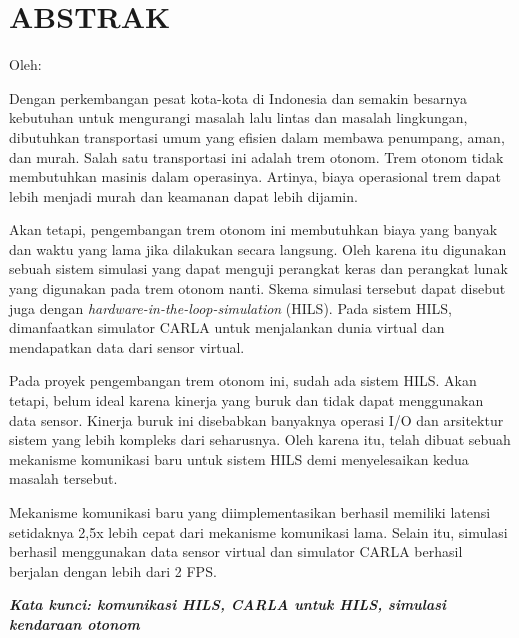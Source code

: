 \chapter*{ABSTRAK}

\begin{center}
	\bfseries \MakeUppercase{\thetitle}

	\normalfont\normalsize
	Oleh:

	\theauthor
\end{center}

\begin{singlespace}
	Dengan perkembangan pesat kota-kota di Indonesia dan semakin besarnya
	kebutuhan untuk mengurangi masalah lalu lintas dan masalah lingkungan,
	dibutuhkan transportasi umum yang efisien dalam membawa penumpang, aman, dan
	murah. Salah satu transportasi ini adalah trem otonom. Trem otonom tidak
	membutuhkan masinis dalam operasinya. Artinya, biaya operasional trem dapat
	lebih menjadi murah dan keamanan dapat lebih dijamin.

	Akan tetapi, pengembangan trem otonom ini membutuhkan biaya yang banyak dan
	waktu yang lama jika dilakukan secara langsung. Oleh karena itu digunakan
	sebuah sistem simulasi yang dapat menguji perangkat keras dan
	perangkat lunak yang digunakan pada trem otonom nanti. Skema simulasi
	tersebut dapat disebut juga dengan \textit{hardware-in-the-loop-simulation}
	(HILS). Pada sistem HILS, dimanfaatkan simulator CARLA untuk menjalankan
	dunia virtual dan mendapatkan data dari sensor virtual.

	Pada proyek pengembangan trem otonom ini, sudah ada sistem HILS. Akan
	tetapi, belum ideal karena kinerja yang buruk dan tidak dapat menggunakan
	data sensor. Kinerja buruk ini disebabkan banyaknya operasi I/O dan
	arsitektur sistem yang lebih kompleks dari seharusnya. Oleh karena itu,
	telah dibuat sebuah mekanisme komunikasi baru untuk sistem HILS demi
	menyelesaikan kedua masalah tersebut.

	Mekanisme komunikasi baru yang diimplementasikan berhasil memiliki latensi
	setidaknya 2,5x lebih cepat dari mekanisme komunikasi lama. Selain itu,
	simulasi berhasil menggunakan data sensor virtual dan simulator CARLA
	berhasil berjalan dengan lebih dari 2 FPS.

	\textbf{\textit{Kata kunci: komunikasi HILS, CARLA untuk HILS, simulasi
			kendaraan otonom}}
\end{singlespace}
\clearpage
